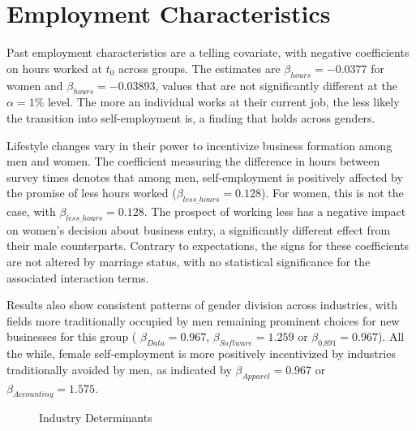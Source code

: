 \section{Employment Characteristics}

Past employment characteristics are a telling covariate, with negative coefficients on hours worked at $t_0$ across groups. The estimates are $\beta_{hours} = -0.0377$ for women and $\beta_{hours} = -0.03893$, values that are not significantly different at the $\alpha = 1 \%$ level. The more an individual works at their current job, the less likely the transition into self-employment is, a finding that holds across genders.

Lifestyle changes vary in their power to incentivize business formation among men and women. The coefficient measuring the difference in hours between survey times denotes that among men, self-employment is positively affected by the promise of less hours worked ($\beta_{less\_hours} = 0.128$). For women, this is not the case, with $\beta_{less\_hours} = 0.128$. The prospect of working less has a negative impact on women’s decision about business entry, a significantly different effect from their male counterparts. Contrary to expectations, the signs for these coefficients are not altered by marriage status, with no statistical significance for the associated interaction terms. 

Results also show consistent patterns of gender division across industries, with fields more traditionally occupied by men remaining prominent choices for new businesses for this group ( $\beta_{Data} = 0.967$, $\beta_{Software} = 1.259$ or $\beta_{0.891} = 0.967$). All the while, female self-employment is more positively incentivized by industries traditionally avoided by men, as indicated by $\beta_{Apparel} = 0.967$ or $\beta_{Accounting} = 1.575$.

\begin{figure}[hbtp]
        \caption{Industry Determinants}  
\end{figure}

